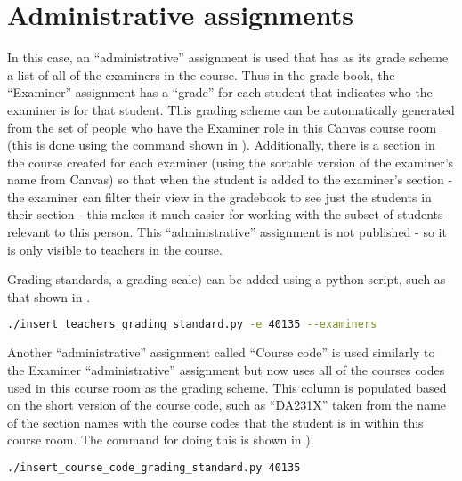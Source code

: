\section{Administrative assignments}
\label{sec:CRAdministrativeAssignments}

In this case, an ``administrative'' assignment is used that has as its grade scheme a list of all of the examiners in the course. Thus in the grade book, the ``Examiner'' assignment has a ``grade'' for each student that indicates who the examiner is for that student.  This grading scheme can be automatically generated from the set of people who have the Examiner role in this Canvas course room (this is done using the command shown in ). Additionally, there is a section in the course created for each examiner (using the sortable version of the examiner's name from Canvas) so that when the student is added to the examiner's section - the examiner can filter their view in the gradebook to see just the students in their section - this makes it much easier for working with the subset of students relevant to this person. This ``administrative'' assignment is not published - so it is only visible to teachers in the course.

Grading standards, \ie a grading scale) can be added using a python script, such as that shown in .
\begin{lstlisting}[basicstyle=\footnotesize, language={bash}, columns=fullflexible, showstringspaces=false, caption={Adding a grading standard for all of the examiners to the course},label=lst:CRaddingGradingStandardA]
./insert_teachers_grading_standard.py -e 40135 --examiners
\end{lstlisting}

Another ``administrative'' assignment called ``Course code'' is used similarly to the Examiner ``administrative'' assignment but now uses all of the courses codes used in this course room as the grading scheme. This column is populated based on the short version of the course code, such as ``DA231X'' taken from the name of the section names with the course codes that the student is in within this course room. The command for doing this is shown in ).
\begin{lstlisting}[basicstyle=\footnotesize, language={bash}, columns=fullflexible, showstringspaces=false, caption={Adding grade standard for the course codes to the course},label=lst:CRaddingGradingStandardB]
./insert_course_code_grading_standard.py 40135
\end{lstlisting}

